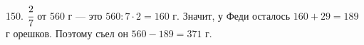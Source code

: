 150. $\cfrac{2}{7}$ от 560 г --- это $560:7\cdot2=160$ г. Значит, у Феди осталось $160+29=189$ г орешков. Поэтому съел он $560-189=371$ г.\\
